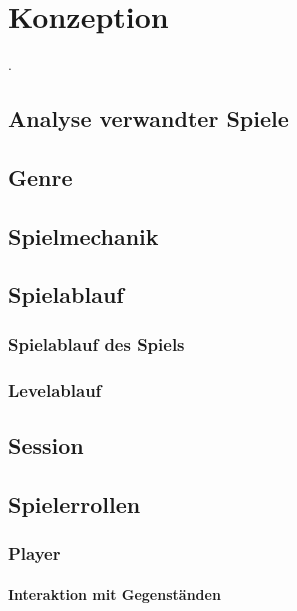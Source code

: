 \chapter{Konzeption}
\cite{harris_leveraging_2016}
.\cite{van_der_vegt_patterns_2001}

\section{Analyse verwandter Spiele}

\section{Genre}

\section{Spielmechanik}

\section{Spielablauf}

\subsection{Spielablauf des Spiels}

\subsection{Levelablauf}

\section{Session}


\section{Spielerrollen}

\subsection{Player}

\subsubsection{Interaktion mit Gegenständen}

